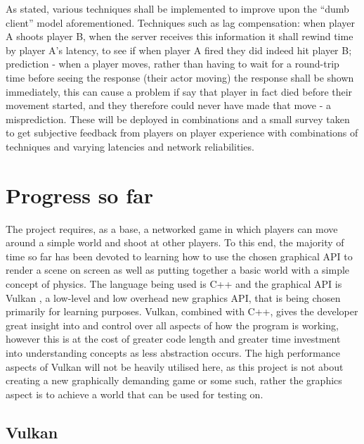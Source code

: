 \documentclass[titlepage]{article}
\begin{document}
	As stated, various techniques shall be implemented to improve upon the ``dumb client'' \cite{carmack} model aforementioned. Techniques such as lag compensation: when player A shoots player B, when the server receives this information it shall rewind time by player A's latency, to see if when player A fired they did indeed hit player B; prediction - when a player moves, rather than having to wait for a round-trip time before seeing the response (their actor moving) the response shall be shown immediately, this can cause a problem if say that player in fact died before their movement started, and they therefore could never have made that move - a misprediction. These will be deployed in combinations and a small survey taken to get subjective feedback from players on player experience with combinations of techniques and varying latencies and network reliabilities.

\newpage

\section{Progress so far}

	The project requires, as a base, a networked game in which players can move around a simple world and shoot at other players. To this end, the majority of time so far has been devoted to learning how to use the chosen graphical API to render a scene on screen as well as putting together a basic world with a simple concept of physics. The language being used is C++ and the graphical API is Vulkan \cite{vulkan}, a low-level and low overhead \cite[Page~3]{vulkanArch} new graphics API, that is being chosen primarily for learning purposes. Vulkan, combined with C++, gives the developer great insight into and control over all aspects of how the program is working, however this is at the cost of greater code length and greater time investment into understanding concepts as less abstraction occurs. The high performance aspects of Vulkan will not be heavily utilised here, as this project is not about creating a new graphically demanding game or some such, rather the graphics aspect is to achieve a world that can be used for testing on.

	\subsection*{Vulkan}
\end{document}
